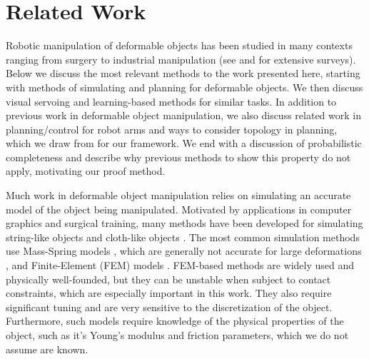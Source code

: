 \section{Related Work}

Robotic manipulation of deformable objects has been studied in many contexts ranging from surgery to industrial manipulation (see \cite{Khalil2010} and \cite{Sanchez2018deformablesurvey} for extensive surveys). Below we discuss the most relevant methods to the work presented here, starting with methods of simulating and planning for deformable objects. We then discuss visual servoing and learning-based methods for similar tasks. In addition to previous work in deformable object manipulation, we also discuss related work in planning/control for robot arms and ways to consider topology in planning, which we draw from for our framework. We end with a discussion of probabilistic completeness and describe why previous methods to show this property do not apply, motivating our proof method.

Much work in deformable object manipulation relies on simulating an accurate model of the object being manipulated. Motivated by applications in computer graphics and surgical training, many methods have been developed for simulating string-like objects \citep{Bergou2008,Rungjiratananon2011} and cloth-like objects \citep{Baraff1998,Goldenthal2007}. The most common simulation methods use Mass-Spring models \citep{Gibson1997, Essahbi2012}, which are generally not accurate for large deformations \citep{Maris2010}, and Finite-Element (FEM) models \citep{Muller2002,Irving2004,Kaufmann2008}. FEM-based methods are widely used and physically well-founded, but they can be unstable when subject to contact constraints, which are especially important in this work. They also require significant tuning and are very sensitive to the discretization of the object. Furthermore, such models require knowledge of the physical properties of the object, such as it's Young's modulus and friction parameters, which we do not assume are known.

